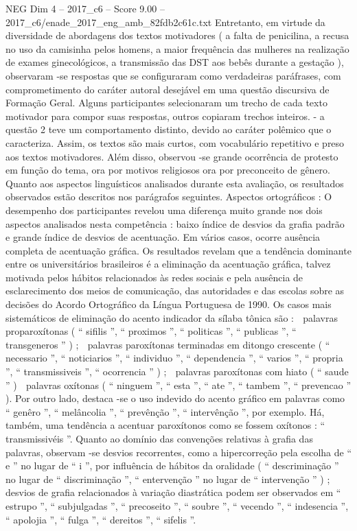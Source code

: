 \begin{textsample}{NEG Dim 4 – 2017\_c6 – Score 9.00 – 2017\_c6/enade\_2017\_eng\_amb\_82fdb2c61c.txt}
Entretanto, em virtude da diversidade de abordagens dos textos motivadores ( a falta de penicilina, a recusa no uso da camisinha pelos homens, a maior frequência das mulheres na realização de exames ginecológicos, a transmissão das DST aos bebês durante a gestação ), observaram -se respostas que se configuraram como verdadeiras paráfrases, com comprometimento do caráter autoral desejável em uma questão discursiva de Formação Geral.
Alguns participantes selecionaram um trecho de cada texto motivador para compor suas respostas, outros copiaram trechos inteiros. - a questão 2 teve um comportamento distinto, devido ao caráter polêmico que o caracteriza.
Assim, os textos são mais curtos, com vocabulário repetitivo e preso aos textos motivadores.
Além disso, observou -se grande ocorrência de protesto em função do tema, ora por motivos religiosos ora por preconceito de gênero.
Quanto aos aspectos linguísticos analisados durante esta avaliação, os resultados observados estão descritos nos parágrafos seguintes.
Aspectos ortográficos : O desempenho dos participantes revelou uma diferença muito grande nos dois aspectos analisados nesta competência : baixo índice de desvios da grafia padrão e grande índice de desvios de acentuação.
Em vários casos, ocorre ausência completa de acentuação gráfica.
Os resultados revelam que a tendência dominante entre os universitários brasileiros é a eliminação da acentuação gráfica, talvez motivada pelos hábitos relacionados às redes sociais e pela ausência de esclarecimento dos meios de comunicação, das autoridades e das escolas sobre as decisões do Acordo Ortográfico da Língua Portuguesa de 1990.
Os casos mais sistemáticos de eliminação do acento indicador da sílaba tônica são :  palavras proparoxítonas ( “ sifilis ”, “ proximos ”, “ politicas ”, “ publicas ”, “ transgeneros ” ) ;  palavras paroxítonas terminadas em ditongo crescente ( “ necessario ”, “ noticiarios ”, “ individuo ”, “ dependencia ”, “ varios ”, “ propria ”, “ transmissiveis ”, “ ocorrencia ” ) ;  palavras paroxítonas com hiato ( “ saude ” )  palavras oxítonas ( “ ninguem ”, “ esta ”, “ ate ”, “ tambem ”, “ prevencao ” ).
Por outro lado, destaca -se o uso indevido do acento gráfico em palavras como “ genêro ”, “ melâncolia ”, “ prevênção ”, “ intervênção ”, por exemplo.
Há, também, uma tendência a acentuar paroxítonos como se fossem oxítonos : “ transmissivéis ”.
Quanto ao domínio das convenções relativas à grafia das palavras, observam -se desvios recorrentes, como a hipercorreção pela escolha de “ e ” no lugar de “ i ”, por influência de hábitos da oralidade ( “ descriminação ” no lugar de “ discriminação ”, “ entervenção ” no lugar de “ intervenção ” ) ; desvios de grafia relacionados à variação diastrática podem ser observados em “ estrupo ”, “ subjulgadas ”, “ precoseito ”, “ soubre ”, “ vecendo ”, “ indesencia ”, “ apolojia ”, “ fulga ”, “ dereitos ”, “ sifelis ”.

\end{textsample}
